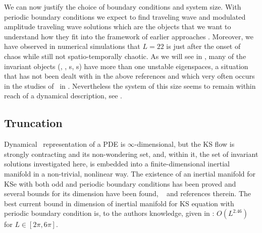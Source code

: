 We can now justify the choice of boundary conditions and system size. With periodic boundary conditions
we expect to find traveling wave and modulated amplitude traveling wave solutions which
are the objects that we want to understand how they fit into the framework of earlier
approaches . Moreover,
we have observed in numerical simulations that $L=22$ is just after the onset of chaos while still
not spatio-temporally chaotic. As we will see in , many of the invariant objects
(\eqva, \reqva, {\po s}, {\rpo s}) have more than one unstable eigenspaces, a situation that has not
been dealt with in the above references and which very often occurs in the studies of \pCf\ in 
. Nevertheless the system of this size seems to remain
within reach of a dynamical description, see .




\subsection{Truncation}

Dynamical \statesp\ representation of a PDE is $\infty$-dimensional,
but the KS flow is strongly contracting and its non-wondering set,
and, within it, the set of invariant solutions investigated here, is
embedded into a finite-dimensional inertial manifold in
a non-trivial, nonlinear way. The existence of an inertial manifold for
KSe with both odd and periodic boundary conditions has been proved and
several bounds for its dimension have been found, \cf\  and references
therein. The best current bound in dimension of inertial manifold for KS
equation with periodic boundary condition is, to the authors knowledge,
given in : $O(L^{2.46})$ for $L\in[2\pi,6\pi]$.

